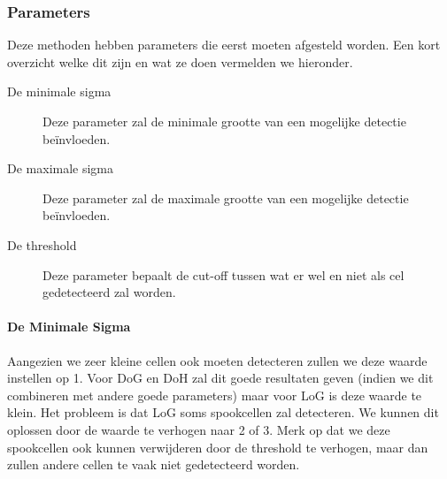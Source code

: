 \documentclass{article}
\begin{document}
\begin{multicols}{2}
\subsubsection{Parameters}
Deze methoden hebben parameters die eerst moeten afgesteld worden. Een kort overzicht welke dit zijn en wat ze doen vermelden we hieronder.

\begin{description}
   \item[De minimale sigma] Deze parameter zal de minimale grootte van een mogelijke detectie beïnvloeden.
   \item[De maximale sigma] Deze parameter zal de maximale grootte van een mogelijke detectie beïnvloeden.
   \item[De threshold] Deze parameter bepaalt de cut-off tussen wat er wel en niet als cel gedetecteerd zal worden.
\end{description}

\paragraph{De Minimale Sigma}
\label{sub:min_sigma}
Aangezien we zeer kleine cellen ook moeten detecteren zullen we deze waarde instellen op 1. Voor DoG en DoH zal dit goede resultaten geven (indien we dit combineren met andere goede parameters) maar voor LoG is deze waarde te klein. Het probleem is dat LoG soms spookcellen zal detecteren. We kunnen dit oplossen door de waarde te verhogen naar 2 of 3. Merk op dat we deze spookcellen ook kunnen verwijderen door de threshold te verhogen, maar dan zullen andere cellen te vaak niet gedetecteerd worden.


\end{multicols}
\end{document}
